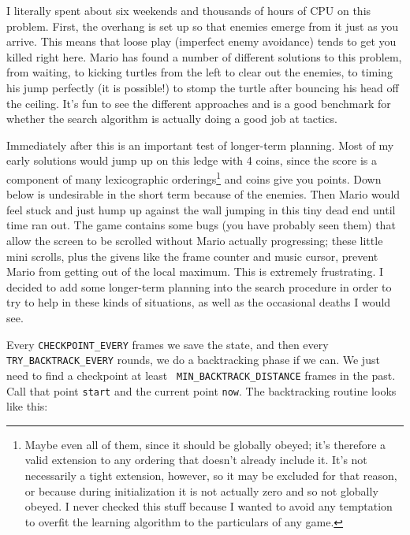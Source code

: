 \documentclass[twocolumn]{article}
\begin{document}
I literally spent about six weekends and thousands of hours of CPU on
this problem. First, the overhang is set up so that enemies emerge
from it just as you arrive. This means that loose play (imperfect
enemy avoidance) tends to get you killed right here. Mario has found a
number of different solutions to this problem, from waiting, to
kicking turtles from the left to clear out the enemies, to timing his
jump perfectly (it is possible!) to stomp the turtle after bouncing his
head off the ceiling. It's fun to see the different approaches and is
a good benchmark for whether the search algorithm is actually doing a
good job at tactics.

Immediately after this is an important test of longer-term planning.
Most of my early solutions would jump up on this ledge with 4 coins,
since the score is a component of many lexicographic
orderings\footnote{Maybe even all of them, since it should be globally
  obeyed; it's therefore a valid extension to any ordering that
  doesn't already include it. It's not necessarily a tight extension,
  however, so it may be excluded for that reason, or because during
  initialization it is not actually zero and so not globally obeyed. I
  never checked this stuff because I wanted to avoid any temptation to
  overfit the learning algorithm to the particulars of any game.} and
coins give you points. Down below is undesirable in the short term
because of the enemies. Then Mario would feel stuck and just hump up
against the wall jumping in this tiny dead end until time ran out. The
game contains some bugs (you have probably seen them) that allow the
screen to be scrolled without Mario actually progressing; these little
mini scrolls, plus the givens like the frame counter and music cursor,
prevent Mario from getting out of the local maximum. This is extremely
frustrating. I decided to add some longer-term planning into the
search procedure in order to try to help in these kinds of situations,
as well as the occasional deaths I would see.

Every {\tt CHECKPOINT\_EVERY} frames we save the state, and then every
{\tt TRY\_BACKTRACK\_EVERY} rounds, we do a backtracking phase if we
can. We just need to find a checkpoint at least {\tt
  MIN\_BACKTRACK\_DISTANCE} frames in the past. Call that point
{\tt start} and the current point {\tt now}. The backtracking
routine looks like this:
\end{document}
